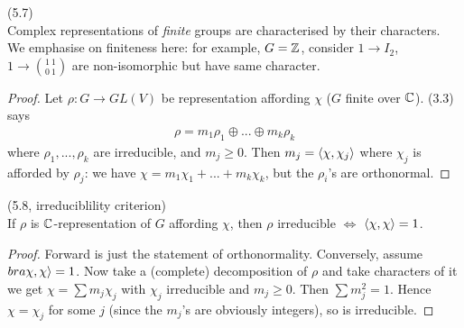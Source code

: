 \documentclass[a4paper]{article}
\begin{document}
\begin{coro} (5.7)\\
Complex representations of \emph{finite} groups are characterised by their characters.\\
We emphasise on finiteness here: for example, $G=\mathbb{Z}$, consider $1 \to I_2$, $1 \to {{1\ 1} \choose {0\ 1}}$ are non-isomorphic but have same character.
\begin{proof}
Let $\rho:G \to GL(V)$ be representation affording $\chi$ ($G$ finite over $\mathbb{C}$). (3.3) says 
\begin{equation*}
\begin{aligned}
\rho = m_1 \rho_1 \oplus ... \oplus m_k \rho_k
\end{aligned}
\end{equation*}
where $\rho_1,...,\rho_k$ are irreducible, and $m_j \geq 0$. Then $m_j = \langle \chi,\chi_j\rangle$ where $\chi_j$ is afforded by $\rho_j$: we have $\chi = m_1\chi_1 + ... + m_k \chi_k$, but the $\rho_i$'s are orthonormal.
\end{proof}
\end{coro}

\begin{coro} (5.8, irreduciblility criterion)\\
If $\rho$ is $\mathbb{C}$-representation of $G$ affording $\chi$, then $\rho$ irreducible $\iff$ $\langle \chi,\chi \rangle = 1$.
\begin{proof}
Forward is just the statement of orthonormality. Conversely, assume $bra \chi,\chi\rangle = 1$. Now take a (complete) decomposition of $\rho$ and take characters of it we get $\chi = \sum m_j \chi_j$ with $\chi_j$ irreducible and $m_j \geq 0$. Then $\sum m^2_j = 1$. Hence $\chi = \chi_j$ for some $j$ (since the $m_j$'s are obviously integers), so is irreducible.
\end{proof}
\end{coro}
\end{document}
